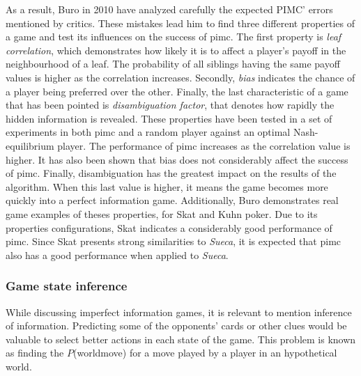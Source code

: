 As a result, Buro in 2010 have analyzed carefully the expected PIMC' errors mentioned by critics. These mistakes lead him to find three different properties of a game and test its influences on the success of \gls{pimc}. The first property is \emph{leaf correlation}, which demonstrates how likely it is to affect a player's payoff in the neighbourhood of a leaf. The probability of all siblings having the same payoff values is higher as the correlation increases. Secondly, \emph{bias} indicates the chance of a player being preferred over the other. Finally, the last characteristic of a game that has been pointed is \emph{disambiguation factor}, that denotes how rapidly the hidden information is revealed. These properties have been tested in a set of experiments in both \gls{pimc} and a random player against an optimal Nash-equilibrium player. The performance of \gls{pimc} increases as the correlation value is higher. It has also been shown that bias does not considerably affect the success of \gls{pimc}. Finally, disambiguation has the greatest impact on the results of the algorithm. When this last value is higher, it means the game becomes more quickly into a perfect information game. Additionally, Buro demonstrates real game examples of theses properties, for Skat and Kuhn poker. Due to its properties configurations, Skat indicates a considerably good performance of \gls{pimc}. Since Skat presents strong similarities to \emph{Sueca}, it is expected that \gls{pimc} also has a good performance when applied to \emph{Sueca}.


\subsubsection{Game state inference}

While discussing imperfect information games, it is relevant to mention  inference of information. Predicting some of the opponents' cards or other clues would be valuable to select better actions in each state of the game. This problem is known as finding the $P$(world\textbar move) for a move played by a player in an hypothetical world.

